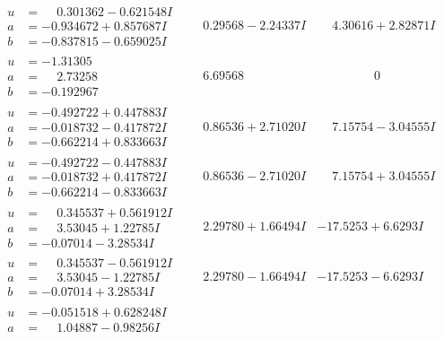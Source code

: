 \documentclass[1p]{elsarticle_modified}
\theoremstyle{definition}
\begin{document}
$$\begin{array}{c|c|c}
 \hline 
\begin{aligned}
u &= \phantom{-}0.301362 - 0.621548 I \\
a &= -0.934672 + 0.857687 I \\
b &= -0.837815 - 0.659025 I\end{aligned}
 & \phantom{-}0.29568 - 2.24337 I & \phantom{-}4.30616 + 2.82871 I \\ \hline\begin{aligned}
u &= -1.31305\phantom{ +0.000000I} \\
a &= \phantom{-}2.73258\phantom{ +0.000000I} \\
b &= -0.192967\phantom{ +0.000000I}\end{aligned}
 & \phantom{-}6.69568\phantom{ +0.000000I} & \phantom{-0.000000 } 0 \\ \hline\begin{aligned}
u &= -0.492722 + 0.447883 I \\
a &= -0.018732 - 0.417872 I \\
b &= -0.662214 + 0.833663 I\end{aligned}
 & \phantom{-}0.86536 + 2.71020 I & \phantom{-}7.15754 - 3.04555 I \\ \hline\begin{aligned}
u &= -0.492722 - 0.447883 I \\
a &= -0.018732 + 0.417872 I \\
b &= -0.662214 - 0.833663 I\end{aligned}
 & \phantom{-}0.86536 - 2.71020 I & \phantom{-}7.15754 + 3.04555 I \\ \hline\begin{aligned}
u &= \phantom{-}0.345537 + 0.561912 I \\
a &= \phantom{-}3.53045 + 1.22785 I \\
b &= -0.07014 - 3.28534 I\end{aligned}
 & \phantom{-}2.29780 + 1.66494 I & -17.5253 + 6.6293 I \\ \hline\begin{aligned}
u &= \phantom{-}0.345537 - 0.561912 I \\
a &= \phantom{-}3.53045 - 1.22785 I \\
b &= -0.07014 + 3.28534 I\end{aligned}
 & \phantom{-}2.29780 - 1.66494 I & -17.5253 - 6.6293 I \\ \hline\begin{aligned}
u &= -0.051518 + 0.628248 I \\
a &= \phantom{-}1.04887 - 0.98256 I \\

\end{aligned}
\end{array}$$
\end{document}
